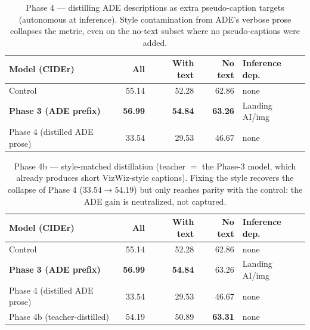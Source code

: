 \begin{table}[t]
  \centering
  \caption{Phase 4 --- distilling ADE descriptions as extra pseudo-caption
    targets (autonomous at inference). Style contamination from ADE's verbose
    prose collapses the metric, even on the no-text subset where no
    pseudo-captions were added.}
  \label{tab:phase4-distill}
  \begin{tabular}{lrrrl}
    \toprule
    Model (CIDEr) & All & With text & No text & Inference dep. \\
    \midrule
    Control                       & 55.14 & 52.28 & 62.86 & none \\
    \textbf{Phase 3 (ADE prefix)} & \textbf{56.99} & \textbf{54.84} & \textbf{63.26} & Landing AI/img \\
    Phase 4 (distilled ADE prose) & 33.54 & 29.53 & 46.67 & none \\
    \bottomrule
  \end{tabular}
\end{table}

\begin{table}[t]
  \centering
  \caption{Phase 4b --- style-matched distillation (teacher ${=}$ the Phase-3
    model, which already produces short VizWiz-style captions). Fixing the style
    recovers the collapse of Phase 4 ($33.54\to54.19$) but only reaches parity
    with the control: the ADE gain is neutralized, not captured.}
  \label{tab:phase4b-distill}
  \begin{tabular}{lrrrl}
    \toprule
    Model (CIDEr) & All & With text & No text & Inference dep. \\
    \midrule
    Control                       & 55.14 & 52.28 & 62.86 & none \\
    \textbf{Phase 3 (ADE prefix)} & \textbf{56.99} & \textbf{54.84} & 63.26 & Landing AI/img \\
    Phase 4 (distilled ADE prose) & 33.54 & 29.53 & 46.67 & none \\
    Phase 4b (teacher-distilled)  & 54.19 & 50.89 & \textbf{63.31} & none \\
    \bottomrule
  \end{tabular}
\end{table}

